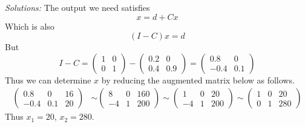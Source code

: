 \ifnum {} {\color{DarkBlue} \textit{Solutions:} 
The output we need satisfies 
$$x = d + Cx$$
Which is also
$$(I-C)x = d$$
But 
$$I-C = \begin{pmatrix} 1&0\\0&1\end{pmatrix} - \begin{pmatrix} 0.2 & 0 \\ 0.4 & 0.9 \end{pmatrix} = \begin{pmatrix} 0.8 & 0 \\ -0.4 & 0.1 \end{pmatrix}$$
Thus we can determine $x$ by reducing the augmented matrix below as follows. 
\begin{align}
    \begin{pmatrix} 0.8 & 0 & 16\\ -0.4 &  0.1 & 20\end{pmatrix} 
    & \sim \begin{pmatrix} 8 & 0 & 160\\ -4 & 1 & 200\end{pmatrix} 
     \sim \begin{pmatrix} 1 & 0 & 20\\ -4 & 1 & 200\end{pmatrix} 
     \sim \begin{pmatrix} 1 & 0 & 20\\ 0 & 1 & 280\end{pmatrix} 
\end{align}
Thus $x_1 = 20$, $x_2 = 280$. 
} 
\fi        
\fi        





\ifnum {}
